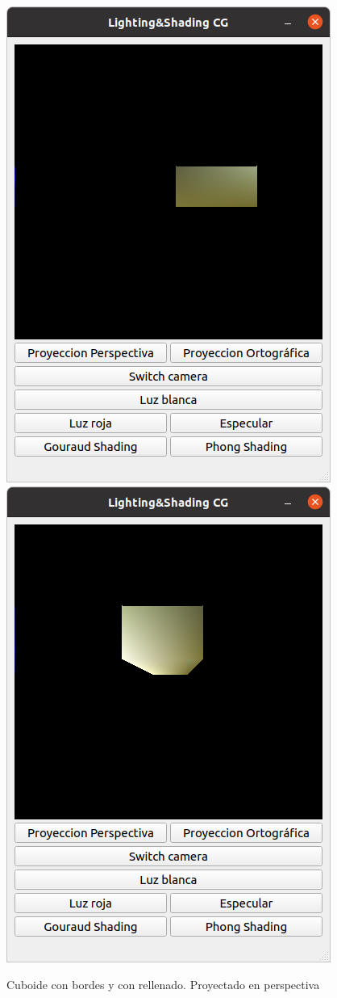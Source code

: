\documentclass[12pt]{article}
\begin{document}
\begin{figure}[H]
\centering
\includegraphics[scale=0.5]{images/ej1.png}
\includegraphics[scale=0.5]{images/ej2.png}
\caption{Cuboide con bordes y con rellenado. Proyectado en perspectiva}
\end{figure}
\end{document}
